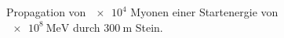 \documentclass[aspectratio=1610, captions=tableheading, 11pt]{beamer}
\begin{document}
\begin{frame}
\begin{figure}
\begin{overprint}
      \caption*{Propagation von $\num{e4}$ Myonen einer Startenergie von $\SI{e8}{\mega\electronvolt}$ durch $\SI{300}{\metre}$ Stein.}
      \label{fig:1}
      \end{overprint}
  \end{figure}
\end{frame}





\end{document}
